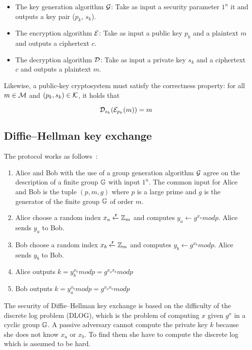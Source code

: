 \begin{itemize}
  \item The key generation algorithm $\mathcal{G}$: Take as input a security parameter $1^{n}$ it and outputs a key pair ($p_k$, $s_k$).
  \item The encryption algorithm $\mathcal{E}$: Take as input a public key $p_k$ and a plaintext $m$ and outputs a ciphertext $c$.
  \item The decryption algorithm $\mathcal{D}$: Take as input a private key $s_k$ and a ciphertext $c$ and outputs a plaintext $m$.
\end{itemize}

Likewise, a public-key cryptosystem must satisfy the correctness property: for all $m \in \mathcal{M}$ and $(p_k, s_k) \in \mathcal{K}$, it holds that

\begin{equation*}
  \mathcal{D}_{s_k}(\mathcal{E}_{p_k}(m)) = m
\end{equation*}

\subsection{Diffie–Hellman key exchange}
\label{preliminaries:pub:dh}

The protocol works as follows~\cite{Katz:2014:IMC:2700550, kiagias:crypto}:

\begin{enumerate}
  \item Alice and Bob  with the use of a group generation algorithm $\mathcal{G}$ agree on the description of a finite group $\mathbb{G}$ with input $1^{n}$. The common input for Alice and Bob is the tuple $(p, m, g)$ where $p$ is a large prime and $g$ is the generator of the finite group $\mathbb{G}$ of order $m$.
  \item Alice choose a random index $x_a \xleftarrow{\mathtt{r}}{\mathbb{Z}_m}$ and computes $y_a \leftarrow{g^{x_a}}modp$. Alice sends $y_a$ to Bob.
  \item Bob choose a random index $x_b \xleftarrow{\mathtt{r}}{\mathbb{Z}_m}$ and computes $y_b \leftarrow{g^{x_b}}modp$. Alice sends $y_b$ to Bob.
  \item Alice outputs $k = y_b^{x_a}modp = g^{{x_a}{x_b}}modp$
  \item Bob outputs $k = y_a^{x_b}modp = g^{{x_a}{x_b}}modp$
\end{enumerate}

The security of Diffie–Hellman key exchange is based on the difficulty of the discrete log problem (DLOG), which is the problem of computing $x$ given $g^{x}$ in a cyclic group $\mathbb{G}$. A passive adversary cannot compute the private key $k$ because she does not know $x_a$ or $x_b$. To find them she have to compute the discrete log which is assumed to be hard.

